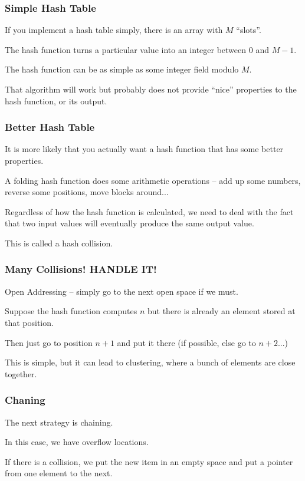 \begin{frame}
\frametitle{Simple Hash Table}

If you implement a hash table simply, there is an array with $M$ ``slots''. 

The hash function turns a particular value into an integer between $0$ and $M-1$. 

The hash function can be as simple as some integer field modulo $M$. 

That algorithm will work but probably does not provide ``nice'' properties to the hash function, or its output. 

\end{frame}


\begin{frame}
\frametitle{Better Hash Table}
It is more likely that you actually want a hash function that has some better properties. 

A \alert{folding} hash function does some arithmetic operations -- add up some numbers, reverse some positions, move blocks around...

Regardless of how the hash function is calculated, we need to deal with the fact that two input values will eventually produce the same output value. 

This is called a \alert{hash collision}.

\end{frame}


\begin{frame}
\frametitle{Many Collisions! HANDLE IT!}

\alert{Open Addressing} -- simply go to the next open space if we must. 

Suppose the hash function computes $n$ but there is already an element stored at that position. 

Then just go to position $n+1$ and put it there (if possible, else go to $n+2$...)

This is simple, but it can lead to clustering, where a bunch of elements are close together.


\end{frame}

\begin{frame}
\frametitle{Chaning}

The next strategy is \alert{chaining}. 

In this case, we have overflow locations. 

If there is a collision, we put the new item in an empty space and put a pointer from one element to the next. 

\end{frame}


